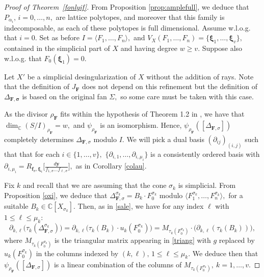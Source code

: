 \documentclass[a4paper,11pt]{amsart}
\newcommand{\C}{\mathbb{C}}
\newcommand{\bff}{{\boldsymbol{f}}}
\newcommand{\bfy}{{\boldsymbol{y}}}
\newcommand{\bfsigma}{{\boldsymbol{\sigma}}}
\newcommand{\bfF}{{\boldsymbol{F}}}
\newcommand{\bfxi}{{\boldsymbol{\xi}}}
\numberwithin{thm}{section}
\numberwithin{equation}{section}
\theoremstyle{definition}
\theoremstyle{plain}
\begin{document}
\begin{proof}[Proof of Theorem~\ref{fonlyif}]
From Proposition \ref{prop:amplefull}, we deduce that $P_{\alpha_i},\, i=0,\ldots, n,$ are lattice polytopes, and moreover that this family is indecomposable, as each of these polytopes is full dimensional. Assume w.l.o.g. that $i=0.$ Set as before  $I=\langle F_1,\ldots, F_n\rangle,$ and
$V_X(F_1,\ldots, F_n)=\{\bfxi_1,\ldots, \bfxi_v\},$ contained in the simplicial part of $X$ and having degree $w\geq v.$
Suppose also w.l.o.g. that $F_0(\bfxi_1)=0.$   

Let $X'$ be a simplicial desingularization of $X$ without the addition of rays. Note that the definition of $J_\bfF$ does not depend on this refinement but the definition of $\Delta_{\bfF,\bfsigma}$
 is based on the original fan $\Sigma,$ so some care must be taken with this case.


As the divisor $\rho_\bfF$
fits within the hypothesis of Theorem 1.2 in \cite{BT22}, we have that $\dim_\C(S/I)_{\rho_\bfF}=w,$ and  $\psi_{\rho_\bfF}$ is an isomorphism. Hence, 
$\psi_{\rho_\bfF}([\Delta_{\bfF,\sigma}])$ completely determines $\Delta_{\bfF,\sigma}$ modulo $I$.
We will pick a dual basis $(\partial_{ij})_{(i,j)}$ such that  that for each $i\in\{1,\ldots, v\},$
 $\{\partial_{i,1},\ldots, \partial_{i,\mu_i}\}$ is a consistently ordered basis  
 with $\partial_{i,\mu_i}=R_{\bff_\sigma, \bfxi_i}\Big[\frac{d\bfy}{f_{1,\sigma}\ldots f_{\ell,\sigma}}\Big] ,$ as in Corollary \ref{colau}.


Fix $k$ and recall that we are assuming that the cone $\sigma_k$ is simplicial. From Proposition \ref{oxi}, 
we deduce that $\Delta^{\sigma_k}_{\bfF,\sigma}= B_{k}\cdot F^{\sigma_k}_{0}$ modulo $\langle F^{\sigma_k}_1,\ldots, F^{\sigma_k}_n\rangle,$
for a suitable $B_k\in\C[X_{\sigma_k}].$ Then, as in \eqref{sale}, we have  for any index $\ell$ with ${1\leq\ell\leq\mu_k}$:
\begin{equation}\label{oxig}
\partial_{k,\ell}\big(\tau_k(\Delta^{\sigma_k}_{\bfF,\sigma})
\big)=
\partial_{k,\ell}\big(\tau_k(B_{k})\cdot u_k(F^{\sigma_k}_{0})\big)
=M_{\tau_k(F^{\sigma_k}_{0})}\cdot \big(\partial_{k,\ell}(\tau_k(B_{k}))\big),
\end{equation}
where $M_{\tau_k(F^{\sigma_k}_{0})}$ is the triangular matrix appearing in \eqref{triang} 
with $g$ replaced by $u_k(F^{\sigma_k}_0)$ in the columns indexed by $(k,\ell),\,1\leq\ell\leq \mu_k.$ 
We deduce then that $\psi_{\rho_\bfF}([\Delta_{\bfF,\sigma}])$ is a linear combination of the columns of $M_{\tau_k(F^{ \sigma_k}_0)}, \ k=1,\ldots, v.$



\end{proof}
\end{document}
